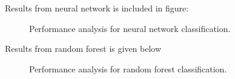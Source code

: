 Results from neural network is included in figure: 
\begin{figure}[H]
\begin{center}
\end{center}
\caption[caption]{Performance analysis for neural network classification.}
\end{figure}

Results from random forest is given below
\begin{figure}[H]
\begin{center}
\end{center}
\caption[caption]{Performance analysis for random forest classification.}
\end{figure}


